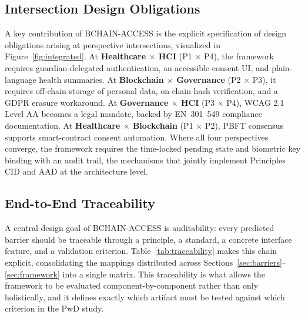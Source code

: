 \documentclass[journal,onecolumn]{IEEEtran}
\begin{document}
\subsection{Intersection Design Obligations}

A key contribution of BCHAIN-ACCESS is the explicit specification of design obligations arising at perspective intersections, visualized in Figure~\ref{fig:integrated}. At \textbf{Healthcare $\times$ HCI} (P1 $\times$ P4), the framework requires guardian-delegated authentication, an accessible consent UI, and plain-language health summaries. At \textbf{Blockchain $\times$ Governance} (P2 $\times$ P3), it requires off-chain storage of personal data, on-chain hash verification, and a GDPR erasure workaround. At \textbf{Governance $\times$ HCI} (P3 $\times$ P4), WCAG 2.1 Level AA becomes a legal mandate, backed by EN~301~549 compliance documentation. At \textbf{Healthcare $\times$ Blockchain} (P1 $\times$ P2), PBFT consensus supports smart-contract consent automation. Where all four perspectives converge, the framework requires the time-locked pending state and biometric key binding with an audit trail, the mechanisms that jointly implement Principles CID and AAD at the architecture level.



\subsection{End-to-End Traceability}
\label{subsec:traceability}

A central design goal of BCHAIN-ACCESS is auditability: every predicted barrier should be traceable through a principle, a standard, a concrete interface feature, and a validation criterion. Table~\ref{tab:traceability} makes this chain explicit, consolidating the mappings distributed across Sections~\ref{sec:barriers}--\ref{sec:framework} into a single matrix. This traceability is what allows the framework to be evaluated component-by-component rather than only holistically, and it defines exactly which artifact must be tested against which criterion in the PwD study.
\end{document}
